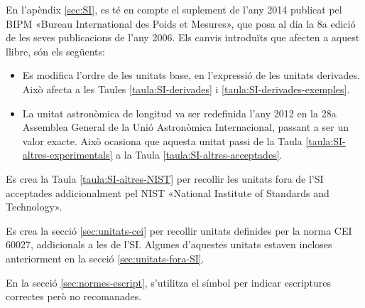 En l'apèndix \ref{sec:SI}, es té en compte el suplement de l'any 2014 publicat pel BIPM «Bureau International des Poids et Mesures», que posa al dia la 8a edició de les seves publicacions de l'any 2006. Els canvis introduïts que afecten a aquest llibre, són els següents:
\begin{itemize}
  \item Es modifica l'ordre de les unitats base, en l'expressió de les unitats derivades. Això afecta  a les Taules \ref{taula:SI-derivades} i \ref{taula:SI-derivades-exemples}.
  \item La unitat astronòmica de longitud va ser redefinida l'any 2012 en la 28a Assemblea General de la Unió Astronòmica Internacional, passant a ser un valor exacte. Això ocasiona que aquesta unitat passi de la Taula \ref{taula:SI-altres-experimentals}  a la Taula  \ref{taula:SI-altres-acceptades}.
\end{itemize}

Es crea la Taula \ref{taula:SI-altres-NIST} per recollir les unitats fora de l'SI acceptades addicionalment pel NIST «National Institute of Standards and Technology».

Es crea la secció \ref{sec:unitats-cei} per recollir  unitats definides per la norma  CEI 60027, addicionals a les de l'SI. Algunes d'aquestes unitats estaven incloses anteriorment en la secció \ref{sec:unitats-fora-SI}.

En la secció \ref{sec:normes-escript}, s'utilitza el símbol \textcolor{Blue}\faQuestionCircle{} per indicar escriptures correctes però no recomanades.

